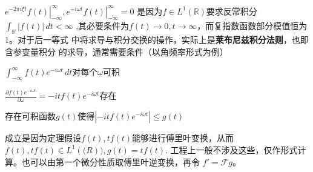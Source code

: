 \documentclass{ctexbook}
\newcommand{\evalat}[3]{\left.#1\right|_{#2}^{#3}}
\begin{document}
$\evalat{e^{-2\pi i\xi t}f(t)}{-\infty}{\infty},\evalat{e^{-i\omega t}f(t)}{-\infty}{\infty}=0$
是因为$f\in L^1(\mathbb{R})$要求反常积分$\int_{\mathbb{R}}|f(t)|\,dt<\infty$
,其必要条件为$f(t)\to 0,t\to\infty$，而复指数函数部分模值恒为1。对于后一等式
中将求导与积分交换的操作，实际上是\textbf{莱布尼兹积分法则}，也即含参变量积分
的求导，通常需要条件（以角频率形式为例）\begin{circlist}
    \item $\int_{-\infty}^{\infty}f(t)e^{-i\omega t}\,dt$对每个$\omega$可积
    \item $\frac{\partial f(t)e^{-i\omega t}}{\partial \omega}=-itf(t)e^{-i\omega t}$存在
    \item 存在可积函数$g(t)$使得$|-itf(t)e^{-i\omega t}|\leq g(t)$
\end{circlist}
成立是因为定理假设$f(t),tf(t)$能够进行傅里叶变换，从而
$f(t),tf(t)\in L^1(\mathbb(R)),g(t)=tf(t)$.
工程上一般不涉及这些，仅作形式计算。也可以由第一个微分性质取傅里叶逆变换，再令
$f'=\mathcal{F} g$。
\end{document}
